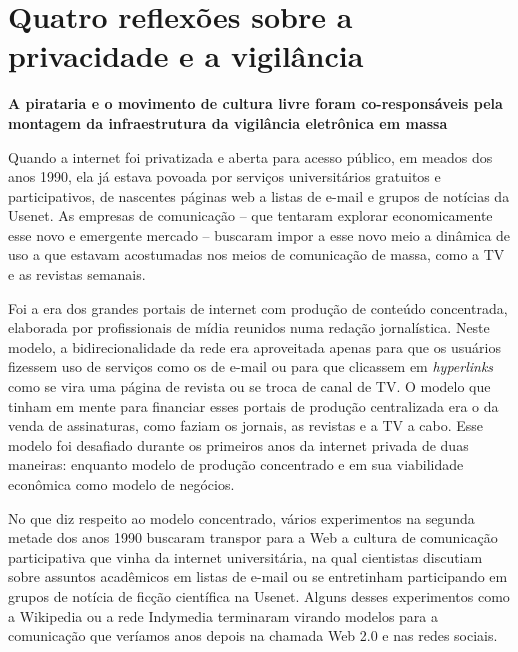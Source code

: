 \chapter{Quatro reflexões sobre a privacidade e a
vigilância}\label{quatro-reflexuxf5es-sobre-a-privacidade-e-a-vigiluxe2ncia}

\textbf{A pirataria e o movimento de cultura livre foram co-responsáveis
pela montagem da infraestrutura da vigilância eletrônica em massa}

Quando a internet foi privatizada e aberta para acesso público, em
meados dos anos 1990, ela já estava povoada por serviços universitários
gratuitos e participativos, de nascentes páginas web a listas de e-mail
e grupos de notícias da Usenet. As empresas de comunicação -- que
tentaram explorar economicamente esse novo e emergente mercado --
buscaram impor a esse novo meio a dinâmica de uso a que estavam
acostumadas nos meios de comunicação de massa, como a TV e as revistas
semanais.

Foi a era dos grandes portais de internet com produção de conteúdo
concentrada, elaborada por profissionais de mídia reunidos numa redação
jornalística. Neste modelo, a bidirecionalidade da rede era aproveitada
apenas para que os usuários fizessem uso de serviços como os de e-mail
ou para que clicassem em \emph{hyperlinks} como se vira uma página de
revista ou se troca de canal de TV. O modelo que tinham em mente para
financiar esses portais de produção centralizada era o da venda de
assinaturas, como faziam os jornais, as revistas e a TV a cabo. Esse
modelo foi desafiado durante os primeiros anos da internet privada de
duas maneiras: enquanto modelo de produção concentrado e em sua
viabilidade econômica como modelo de negócios.

No que diz respeito ao modelo concentrado, vários experimentos na
segunda metade dos anos 1990 buscaram transpor para a Web a cultura de
comunicação participativa que vinha da internet universitária, na qual
cientistas discutiam sobre assuntos acadêmicos em listas de e-mail ou se
entretinham participando em grupos de notícia de ficção científica na
Usenet. Alguns desses experimentos como a Wikipedia ou a rede Indymedia
terminaram virando modelos para a comunicação que veríamos anos depois
na chamada Web 2.0 e nas redes sociais.

